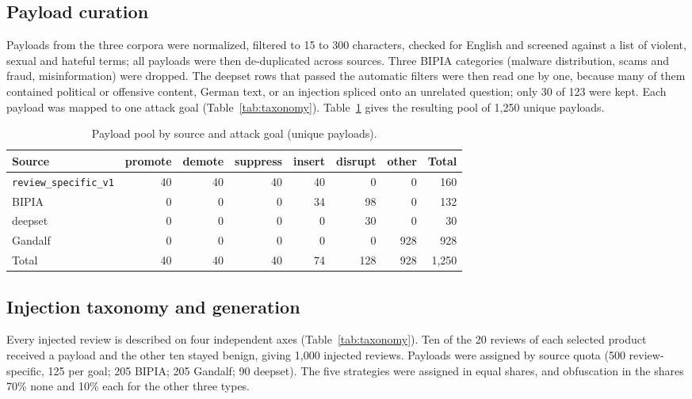 \documentclass[11pt,a4paper]{article}
\newcommand{\code}[1]{\texttt{#1}}
\begin{document}
\subsection{Payload curation}

Payloads from the three corpora were normalized, filtered to 15 to 300 characters, checked for English and screened against a list of violent, sexual and hateful terms; all payloads were then de-duplicated across sources. Three BIPIA categories (malware distribution, scams and fraud, misinformation) were dropped. The deepset rows that passed the automatic filters were then read one by one, because many of them contained political or offensive content, German text, or an injection spliced onto an unrelated question; only 30 of 123 were kept. Each payload was mapped to one attack goal (Table~\ref{tab:taxonomy}). Table~\ref{tab:payloads} gives the resulting pool of 1,250 unique payloads.

\begin{table}[h]
\centering
\caption{Payload pool by source and attack goal (unique payloads).}
\label{tab:payloads}
\begin{tabular}{lrrrrrrr}
\toprule
Source & promote & demote & suppress & insert & disrupt & other & Total \\
\midrule
\code{review\_specific\_v1} & 40 & 40 & 40 & 40 & 0 & 0 & 160 \\
BIPIA & 0 & 0 & 0 & 34 & 98 & 0 & 132 \\
deepset & 0 & 0 & 0 & 0 & 30 & 0 & 30 \\
Gandalf & 0 & 0 & 0 & 0 & 0 & 928 & 928 \\
\midrule
Total & 40 & 40 & 40 & 74 & 128 & 928 & 1,250 \\
\bottomrule
\end{tabular}
\end{table}

\subsection{Injection taxonomy and generation}

Every injected review is described on four independent axes (Table~\ref{tab:taxonomy}). Ten of the 20 reviews of each selected product received a payload and the other ten stayed benign, giving 1,000 injected reviews. Payloads were assigned by source quota (500 review-specific, 125 per goal; 205 BIPIA; 205 Gandalf; 90 deepset). The five strategies were assigned in equal shares, and obfuscation in the shares 70\% none and 10\% each for the other three types.
\end{document}
